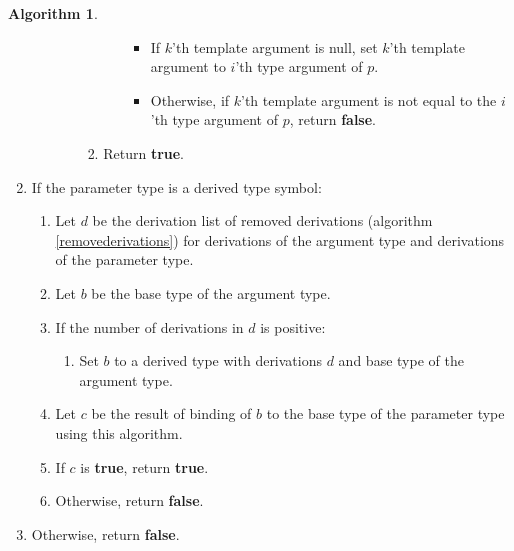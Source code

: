 \documentclass[a4paper,oneside,11pt]{book}
\theoremstyle{definition}
\newtheorem{algo}{Algorithm}[section]
\begin{document}
\begin{algo}
\begin{enumerate}
\begin{enumerate}
\begin{enumerate}
\begin{enumerate}
\begin{itemize}
\begin{itemize}
\item
If $k$'th template argument is null, set $k$'th template argument to $i$'th type argument of $p$.
\item
Otherwise, if $k$'th template argument is not equal to the $i$'th type argument of $p$, return \textbf{false}.
\end{itemize}
\end{itemize}
\item
Return \textbf{true}.
\end{enumerate}
\end{enumerate}
\end{enumerate}
\item
If the parameter type is a derived type symbol:
\begin{enumerate}
\item
Let $d$ be the derivation list of removed derivations (algorithm \ref{removederivations})
for derivations of the argument type and derivations of the parameter type.
\item
Let $b$ be the base type of the argument type.
\item
If the number of derivations in $d$ is positive:
\begin{enumerate}
\item
Set $b$ to a derived type with derivations $d$ and base type of the argument type.
\end{enumerate}
\item
Let $c$ be the result of binding of $b$ to the base type of the parameter type using this algorithm.
\item
If $c$ is \textbf{true}, return \textbf{true}.
\item
Otherwise, return \textbf{false}.
\end{enumerate}
\item
Otherwise, return \textbf{false}.
\end{enumerate}
\end{algo}
\end{document}
